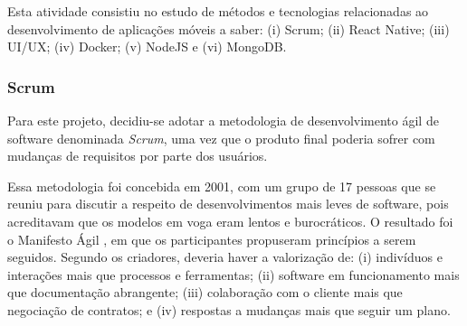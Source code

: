 
Esta atividade consistiu no estudo de métodos e tecnologias relacionadas ao desenvolvimento de aplicações móveis a saber: (i) Scrum; (ii) React Native; (iii) UI/UX; (iv) Docker; (v) NodeJS e (vi) MongoDB.


  
    
    
    
    


\subsubsection{Scrum} 
Para este projeto, decidiu-se adotar a metodologia de desenvolvimento ágil de software denominada \textit{Scrum}, uma vez que o produto final poderia sofrer com mudanças de requisitos por parte dos usuários. 

Essa metodologia foi concebida em 2001, com um grupo de 17 pessoas que se reuniu para discutir a respeito de desenvolvimentos mais leves de software, pois acreditavam que os modelos em voga eram lentos e burocráticos. O resultado foi o Manifesto Ágil \citep{agileManifesto}, em que os participantes propuseram princípios a serem seguidos. Segundo os criadores, deveria haver a valorização de: (i) indivíduos e interações mais que processos e ferramentas; (ii) software em funcionamento mais que documentação abrangente; (iii) colaboração com o cliente mais que negociação de contratos; e (iv) respostas a mudanças mais que seguir um plano.

